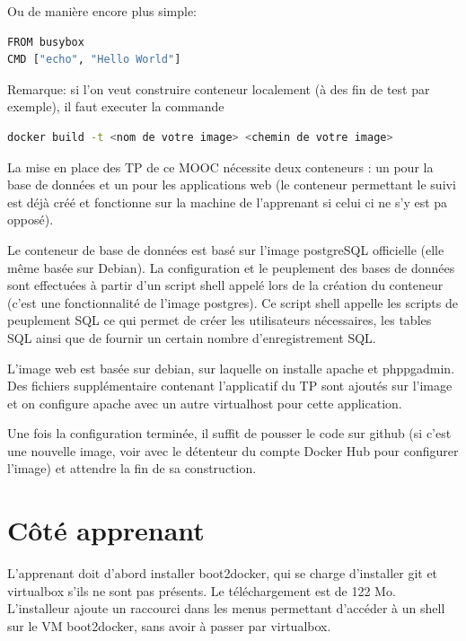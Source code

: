 \documentclass[a4paper,11pt]{report}
\begin{document}
Ou de manière encore plus simple:

\begin{lstlisting}[language=Bash,caption={Dockerfile Hello World simplifié}]
FROM busybox
CMD ["echo", "Hello World"]
\end{lstlisting}

Remarque: si l'on veut construire conteneur localement (à des fin de test par exemple), il faut executer la commande 
\begin{lstlisting}[language=Bash,caption={Construire une image docker}]
docker build -t <nom de votre image> <chemin de votre image>
\end{lstlisting}

La mise en place des TP de ce MOOC nécessite deux conteneurs : un pour la base de données et un pour les applications web (le conteneur permettant le suivi est déjà créé et fonctionne sur la machine de l'apprenant si celui ci ne s'y est pa opposé).

Le conteneur de base de données est basé sur l'image postgreSQL officielle (elle même basée sur Debian). La configuration et le peuplement des bases de données sont effectuées à partir d'un script shell appelé lors de la création du conteneur (c'est une fonctionnalité de l'image postgres). Ce script shell appelle les scripts de peuplement SQL ce qui permet de créer les utilisateurs nécessaires, les tables SQL ainsi que de fournir un certain nombre d'enregistrement SQL.

L'image web est basée sur debian, sur laquelle on installe apache et phppgadmin. Des fichiers supplémentaire contenant l'applicatif du TP sont ajoutés sur l'image et on configure apache avec un autre virtualhost pour cette application.

Une fois la configuration terminée, il suffit de pousser le code sur github (si c'est une nouvelle image, voir avec le détenteur du compte Docker Hub pour configurer l'image) et attendre la fin de sa construction.

\section{Côté apprenant}

L'apprenant doit d'abord installer boot2docker, qui se charge d'installer git et virtualbox s'ils ne sont pas présents. Le téléchargement est de 122 Mo. L'installeur ajoute un raccourci dans les menus permettant d'accéder à un shell sur le VM boot2docker, sans avoir à passer par virtualbox. 
\end{document}
